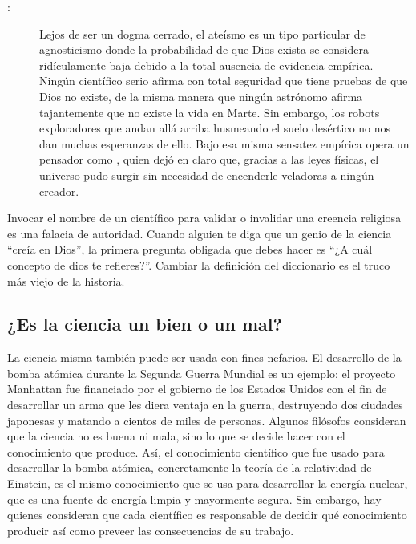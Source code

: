 \begin{description}
	\item[{}:] Lejos de ser un dogma cerrado, el ateísmo es un tipo particular de agnosticismo donde la probabilidad de que Dios exista se considera ridículamente baja debido a la total ausencia de evidencia empírica.
	      Ningún científico serio afirma con total seguridad que tiene pruebas de que Dios no existe, de la misma manera que ningún astrónomo afirma tajantemente que no existe la vida en Marte.
	      Sin embargo, los robots exploradores que andan allá arriba husmeando el suelo desértico no nos dan muchas esperanzas de ello.
	      Bajo esa misma sensatez empírica opera un pensador como \cite{Hawking2010}, quien dejó en claro que, gracias a las leyes físicas, el universo pudo surgir sin necesidad de encenderle veladoras a ningún creador.
\end{description}

\begin{remember}
	Invocar el nombre de un científico para validar o invalidar una creencia religiosa es una falacia de autoridad.
	Cuando alguien te diga que un genio de la ciencia “creía en Dios”, la primera pregunta obligada que debes hacer es “¿A cuál concepto de dios te refieres?”.
	Cambiar la definición del diccionario es el truco más viejo de la historia.
\end{remember}

\subsection*{¿Es la ciencia un bien o un mal?}
\label{sub:eslacienciaunbienounmal}

La ciencia misma también puede ser usada con fines nefarios.
El desarrollo de la bomba atómica durante la Segunda Guerra Mundial es un ejemplo; el proyecto Manhattan fue financiado por el gobierno de los Estados Unidos con el fin de desarrollar un arma que les diera ventaja en la guerra, destruyendo dos ciudades japonesas y matando a cientos de miles de personas.
Algunos filósofos consideran que la ciencia no es buena ni mala, sino lo que se decide hacer con el conocimiento que produce.
Así, el conocimiento científico que fue usado para desarrollar la bomba atómica, concretamente la teoría de la relatividad de Einstein, es el mismo conocimiento que se usa para desarrollar la energía nuclear, que es una fuente de energía limpia y mayormente segura.
Sin embargo, hay quienes consideran que cada científico es responsable de decidir qué conocimiento producir así como preveer las consecuencias de su trabajo.


